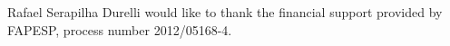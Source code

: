 Rafael Serapilha Durelli would like to thank the financial support provided by FAPESP, process number 2012/05168-4. %